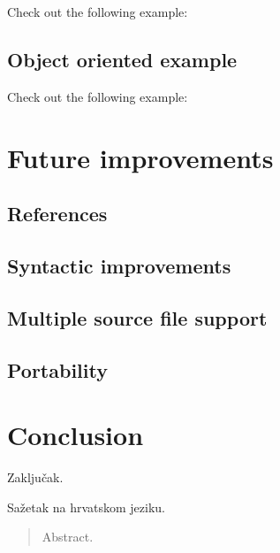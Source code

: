 \documentclass[times, utf8, diplomski]{fer}
\theoremstyle{definition}
\newcommand{\textcode}[3]{
    
}
\begin{document}
Check out the following example:
\textcode{\resdir/programs/memory_alloc.agt}{}{a}

\section{Object oriented example}

Check out the following example:
\textcode{\resdir/programs/string_mgmt.agt}{}{a}


\chapter{Future improvements}

\section{References}

\section{Syntactic improvements}

\section{Multiple source file support}

\section{Portability}





\chapter{Conclusion}
Zaključak.




\begin{sazetak}
Sažetak na hrvatskom jeziku.

\end{sazetak}

\begin{abstract}
Abstract.

\end{abstract}
\end{document}
